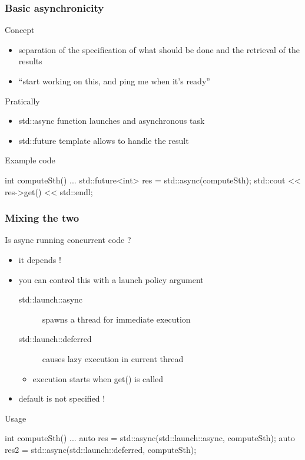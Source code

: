 \begin{frame}[fragile]
  \frametitle{Basic asynchronicity}
  \begin{block}{Concept}
    \begin{itemize}
    \item separation of the specification of what should be done and the retrieval of the results
    \item ``start working on this, and ping me when it's ready''
    \end{itemize}
  \end{block}
  \pause
  \begin{block}{Pratically}
    \begin{itemize}
    \item std::async function launches and asynchronous task
    \item std::future template allows to handle the result
    \end{itemize}
  \end{block}
  \pause
  \begin{exampleblock}{Example code}
    \begin{cppcode*}{}
      int computeSth() {...}
      std::future<int> res = std::async(computeSth);
      std::cout << res->get() << std::endl;
    \end{cppcode*}
  \end{exampleblock}
\end{frame}

\begin{frame}[fragile]
  \frametitle{Mixing the two}
  \begin{block}{Is async running concurrent code ?}
    \begin{itemize}
    \item it depends !
    \item you can control this with a launch policy argument
      \begin{description}
      \item[std::launch::async] spawns a thread for immediate execution
      \item[std::launch::deferred] causes lazy execution in current thread
      \end{description}
      \begin{itemize}
      \item execution starts when get() is called
      \end{itemize}
    \item default is not specified !
    \end{itemize}
  \end{block}
  \pause
  \begin{exampleblock}{Usage}
    \begin{cppcode*}{}
      int computeSth() {...}
      auto res = std::async(std::launch::async,
                            computeSth);
      auto res2 = std::async(std::launch::deferred,
                             computeSth);
    \end{cppcode*}
  \end{exampleblock}
\end{frame}


